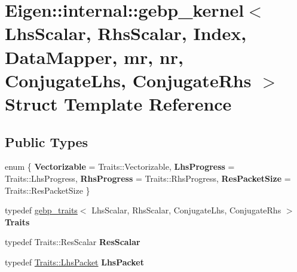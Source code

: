 \hypertarget{struct_eigen_1_1internal_1_1gebp__kernel}{}\section{Eigen\+::internal\+::gebp\+\_\+kernel$<$ Lhs\+Scalar, Rhs\+Scalar, Index, Data\+Mapper, mr, nr, Conjugate\+Lhs, Conjugate\+Rhs $>$ Struct Template Reference}
\label{struct_eigen_1_1internal_1_1gebp__kernel}
\subsection*{Public Types}
\begin{DoxyCompactItemize}
\item 
\mbox{\label{struct_eigen_1_1internal_1_1gebp__kernel_a36bb08659a7cd78d50462e4caa762651}} 
enum \{ {\bfseries Vectorizable} = Traits\+::Vectorizable, 
{\bfseries Lhs\+Progress} = Traits\+::Lhs\+Progress, 
{\bfseries Rhs\+Progress} = Traits\+::Rhs\+Progress, 
{\bfseries Res\+Packet\+Size} = Traits\+::Res\+Packet\+Size
 \}
\item 
\mbox{\label{struct_eigen_1_1internal_1_1gebp__kernel_a6a9cda2b9874531c270a04e6832d31ff}} 
typedef \mbox{\hyperlink{class_eigen_1_1internal_1_1gebp__traits}{gebp\+\_\+traits}}$<$ Lhs\+Scalar, Rhs\+Scalar, Conjugate\+Lhs, Conjugate\+Rhs $>$ {\bfseries Traits}
\item 
\mbox{\label{struct_eigen_1_1internal_1_1gebp__kernel_abcd48a522e4a7a6a8a1e4445d384ae34}} 
typedef Traits\+::\+Res\+Scalar {\bfseries Res\+Scalar}
\item 
\mbox{\label{struct_eigen_1_1internal_1_1gebp__kernel_ab582b2aa13b4850eb1d2e21ffa6f5a4f}} 
typedef \mbox{\hyperlink{struct_eigen_1_1internal_1_1true__type}{Traits\+::\+Lhs\+Packet}} {\bfseries Lhs\+Packet}
\item 
\mbox{\label{struct_eigen_1_1internal_1_1gebp__kernel_a0173951a3e20a8831bc72928cdeadfdb}} 

\end{DoxyCompactItemize}
